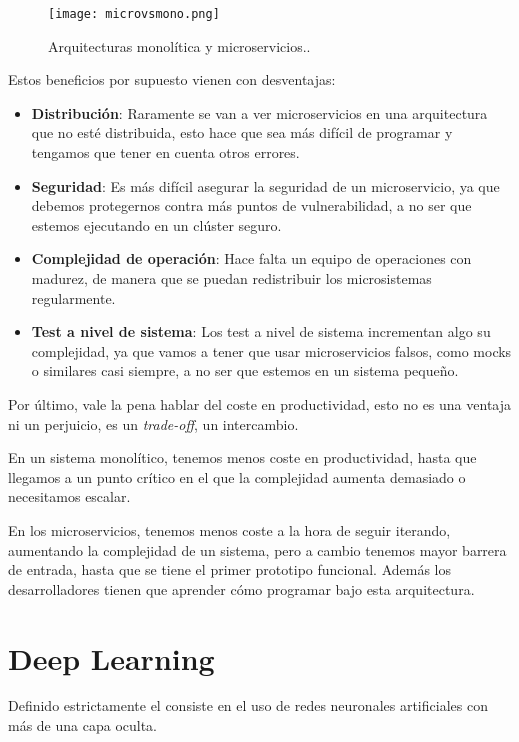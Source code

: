 \begin{figure}
	\centering
	\texttt{[image: microvsmono.png]}
	\caption[Arquitecturas monolítica y microservicios]{Arquitecturas monolítica y microservicios.\cite{fow14}.}\label{fig:microvsmono.png}
\end{figure}

Estos beneficios por supuesto vienen con desventajas:

\begin{itemize}
\item \textbf{Distribución}: Raramente se van a ver microservicios en una arquitectura que no esté distribuida, esto hace que sea más difícil de programar y tengamos que tener en cuenta otros errores.
\item \textbf{Seguridad}: Es más difícil asegurar la seguridad de un microservicio, ya que debemos protegernos contra más puntos de vulnerabilidad, a no ser que estemos ejecutando en un clúster seguro.
\item \textbf{Complejidad de operación}: Hace falta un equipo de operaciones con madurez, de manera que se puedan redistribuir los microsistemas regularmente.
\item \textbf{Test a nivel de sistema}: Los test a nivel de sistema incrementan algo su complejidad, ya que vamos a tener que usar microservicios falsos, como mocks o similares casi siempre, a no ser que estemos en un sistema pequeño.
\end{itemize}

Por último, vale la pena hablar del coste en productividad, esto no es una ventaja ni un perjuicio, es un \textit{trade-off}, un intercambio.

En un sistema monolítico, tenemos menos coste en productividad, hasta que llegamos a un punto crítico en el que la complejidad aumenta demasiado o necesitamos escalar.

En los microservicios, tenemos menos coste a la hora de seguir iterando, aumentando la complejidad de un sistema, pero a cambio tenemos mayor barrera de entrada, hasta que se tiene el primer prototipo funcional. Además los desarrolladores tienen que aprender cómo programar bajo esta arquitectura.

\section{Deep Learning}

Definido estrictamente el  consiste en el uso de redes neuronales artificiales con más de una capa oculta. 

